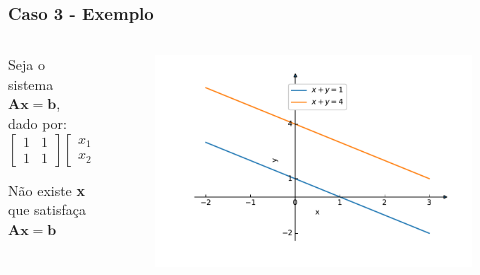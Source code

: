 \documentclass{beamer}
\theoremstyle{mystyle}
\begin{document}
\begin{frame}
	\frametitle{Caso 3 - Exemplo}
	\begin{columns}
		\begin{column}{0.4\textwidth} 
			Seja o sistema $ \mathbf{Ax} = \mathbf{b}$, dado por:
			\begin{equation*}
				\left[
				\begin{array}{cc}
					1 & 1 \\
					1 & 1 
				\end{array}
				\right] 
				\begin{bmatrix} x_{1} \\ x_{2} \end{bmatrix}
				=
				\begin{bmatrix} 1 \\ 4 \end{bmatrix}
			\end{equation*}
			
			Não existe \textbf{x} que satisfaça $ \mathbf{Ax} = \mathbf{b}$
		\end{column}
		\begin{column}{0.6\textwidth}	
			\begin{figure}
				\centering
				\includegraphics[width=\linewidth]{Figuras/grafico_03}
				\label{fig:grafico_03}
			\end{figure}
		\end{column}
	\end{columns}
\end{frame}
\end{document}
